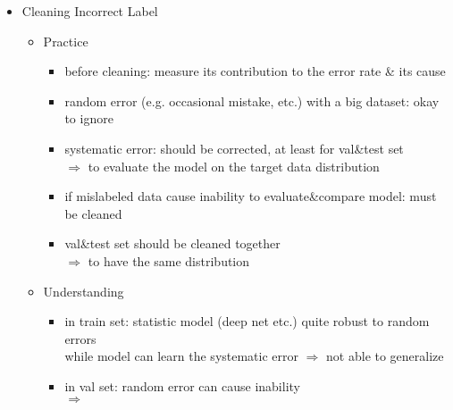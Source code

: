 \begin{itemize}
\item Cleaning Incorrect Label
	\begin{itemize}
	\item Practice 
		\begin{itemize}
		\item before cleaning: measure its contribution to the error rate \& its cause
		\item random error (e.g. occasional mistake, etc.) with a big dataset: okay to ignore
		\item systematic error: should be corrected, at least for val\&test set \\
		$\Rightarrow$ to evaluate the model on the target data distribution
		\item if mislabeled data cause inability to evaluate\&compare model: must be cleaned
		\item val\&test set should be cleaned together \\
		$\Rightarrow$ to have the same distribution
		\end{itemize}
	\item Understanding
		\begin{itemize}
		\item in train set: statistic model (deep net etc.) quite robust to random errors \\
		while model can learn the systematic error $\Rightarrow$ not able to generalize
		\item in val set: random error can cause inability  \\ 
		$\Rightarrow$ 
		\end{itemize}
	\end{itemize}
\end{itemize}


